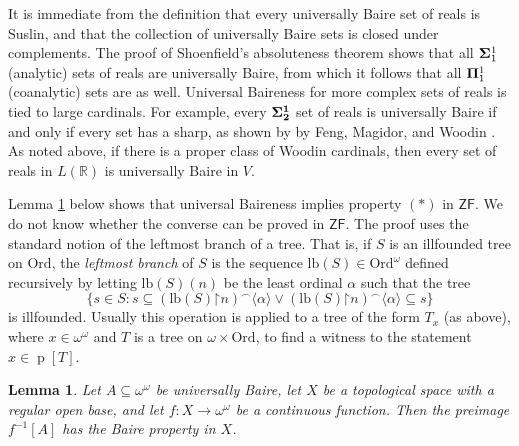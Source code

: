 \documentclass[fleqn, 11pt]{amsart}
\theoremstyle{plain}
\newtheorem{lem}[thm]{Lemma} \newtheorem*{lem*}{Lemma}
\theoremstyle{definition}
\theoremstyle{remark}
\newcommand{\Ord}{\mathrm{Ord}}
\newcommand{\bfSigma}{\bf{\Sigma}}
\newcommand{\ScS}{\mathrm{ScS}}
\newcommand{\uB}{\mathrm{uB}}
\newcommand{\lb}{\mathrm{lb}}
\newcommand{\restrict}{\mathord{\restriction}}
\DeclareMathOperator{\p}{p}
\begin{document}
It is immediate from the definition that every universally Baire set of reals is Suslin, and that the collection of universally Baire sets is closed under complements. 
The proof of Shoenfield's absoluteness theorem shows that all ${\bf \Sigma}^1_1$ (analytic) sets of reals are universally Baire, from which it follows that all ${\bf \Pi}^1_1$ (coanalytic) sets are as well. 
Universal Baireness for more complex sets of reals is tied to large cardinals.
For example, every $\bfSigma^1_2$ set of reals is universally Baire if and only if every set has a sharp, as shown by by Feng, Magidor, and Woodin  \cite[Theorem~3.4]{FenMagWoo}.
As noted above, if there is a proper class of Woodin cardinals, then every set of reals in $L(\mathbb{R})$ is universally Baire in $V$.
% 

Lemma \ref{uBimpliesstar} below shows that universal Baireness implies property $(\ast)$ in $\mathsf{ZF}$.
We do not know whether the converse can be proved in $\mathsf{ZF}$. The proof uses the standard notion of the leftmost branch of a tree. That is, if $S$ is an illfounded tree on $\Ord$, the \emph{leftmost branch} of $S$ is the sequence $\lb(S) \in \Ord^{\omega}$ defined recursively by letting $\lb(S)(n)$ be the least ordinal $\alpha$ such that the tree \[\{ s \in S : s \subseteq (\lb(S)\restrict n)^{\frown}\langle \alpha \rangle \vee  (\lb(S)\restrict n)^{\frown}\langle \alpha \rangle \subseteq s\}\] is illfounded. Usually this operation is applied to a tree of the form $T_{x}$ (as above), where $x \in \omega^{\omega}$ and $T$ is a tree on $\omega \times \Ord$, to find a witness to the statement $x \in \p[T]$. 


\begin{lem}\label{uBimpliesstar}
 Let $A \subseteq \omega^\omega$ be universally Baire, let $X$ be a topological space with a regular open base, and let $f \colon X \to \omega^\omega$ be a continuous function.  Then the preimage $f^{-1}[A]$ has the Baire property in $X$.
\end{lem}
\end{document}
